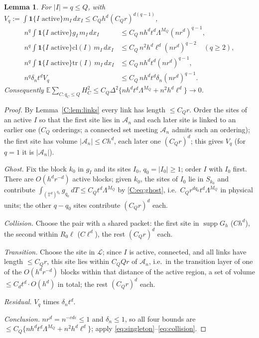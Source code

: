 \documentclass[11pt]{article}
\newtheorem{lemma}[lemma]{Lemma}
\newcommand{\E}{\mathbb{E}}
\newcommand{\Torus}{\mathbb{T}}
\newcommand{\abs}[1]{\lvert #1\rvert}
\newcommand{\one}{\mathbf{1}}
\begin{document}
\begin{lemma}\label{C:lem:sums}
For \(\abs I=q\le Q\), with \(V_q:=\int\one\{I\text{ active}\}m_I\,dx_I\le C_Qh^d(C_Qr)^{d(q-1)}\),
\begin{align*}
 n^q\int\one\{I\text{ active}\}g_I\,m_I\,dx_I&\le C_Q\,nh^dt^d\Lambda^{M_Q}(nr^d)^{q-1},\\
 n^q\int\one\{I\text{ active}\}\mathrm{cl}(I)\,m_I\,dx_I&\le C_Q\,n^2h^d\ell^d(nr^d)^{q-2}\quad(q\ge2),\\
 n^q\int\one\{I\text{ active}\}\mathrm{tr}(I)\,m_I\,dx_I&\le C_Q\,nh^dt^d(nr^d)^{q-1},\\
 n^q\delta_nt^dV_q&\le C_Q\,nh^dt^d\delta_n(nr^d)^{q-1}.
\end{align*}
Consequently \(\E\sum_{C:q_C\le Q}H_C^2\le C_Q\Delta^2\{nh^dt^d\Lambda^{M_Q}+n^2h^d\ell^d\}\to0\).
\end{lemma}
\begin{proof}
By Lemma~\ref{C:lem:links} every link has length \(\le C_Qr\).  Order the
sites of an active \(I\) so that the first site lies in \(\mathcal A_n\) and
each later site is linked to an earlier one (\(C_Q\) orderings; a
connected set meeting \(\mathcal A_n\) admits such an ordering); the first
site has volume \(\abs{\mathcal A_n}\le Ch^d\), each later one
\((C_Qr)^d\); this gives \(V_q\) (for \(q=1\) it is \(\abs{\mathcal A_n}\)).

\emph{Ghost.}  Fix the block \(k_0\) in \(g_I\) and its sites \(I_0\),
\(q_0=\abs{I_0}\ge1\); order \(I\) with \(I_0\) first.  There are
\(O(h^dr^{-d})\) active blocks; given \(k_0\), the sites of \(I_0\) lie in
\(S_{k_0}\) and contribute \(\int_{(\Torus^d)^{q_0}}g_{q_0}\,dT\le C_Qt^d\Lambda^{M_Q}\)
by \eqref{C:eq:ghost}, i.e.\ \(C_Qr^{dq_0}t^d\Lambda^{M_Q}\) in physical
units; the other \(q-q_0\) sites contribute \((C_Qr)^d\) each.

\emph{Collision.}  Choose the pair with a shared packet: the first site
in \(\operatorname{supp}G_h\) (\(Ch^d\)), the second within \(R_0\ell\)
(\(C\ell^d\)), the rest \((C_Qr)^d\) each.

\emph{Transition.}  Choose the site in \(\mathcal L\); since \(I\) is
active, connected, and all links have length \(\le C_Qr\), this site lies
within \(C_QQr\) of \(\mathcal A_n\), i.e.\ in the transition layer of one
of the \(O(h^dr^{-d})\) blocks within that distance of the active region,
a set of volume \(\le C_dt^d\cdot O(h^d)\) in total; the rest
\((C_Qr)^d\) each.

\emph{Residual.}  \(V_q\) times \(\delta_nt^d\).

\emph{Conclusion.}  \(nr^d=n^{-cd\varepsilon}\le1\) and \(\delta_n\le1\), so all
four bounds are \(\le C_Q\{nh^dt^d\Lambda^{M_Q}+n^2h^d\ell^d\}\); apply
\eqref{eq:singleton}--\eqref{eq:collision}.
\end{proof}
\end{document}
